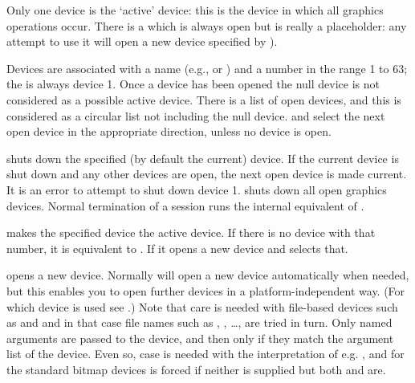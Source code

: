\begin{Details}\relax
Only one device is the `active' device: this is the device in
which all graphics operations occur.  There is a 
which is always open but is really a placeholder: any attempt to use
it will open a new device specified by
).

Devices are associated with a name (e.g.,  or
) and a number in the range 1 to 63; the
 is always device 1.  Once a device has been
opened the null device is not considered as a possible active device.
There is a list of open devices, and this is considered as a circular
list not including the null device.   and
 select the next open device in the appropriate
direction, unless no device is open.

 shuts down the specified (by default the current)
device.  If the current device is shut down and any other devices are
open, the next open device is made current.  It is an error to
attempt to shut down device 1.   shuts down all
open graphics devices.  Normal termination of a session runs the
internal equivalent of .

 makes the specified device the active device.  If there
is no device with that number, it is equivalent to .
If  it opens a new device and selects that.

 opens a new device.  Normally \R{} will open a new device
automatically when needed, but this enables you to open further
devices in a platform-independent way.  (For which device is used see
.)  Note that care is needed with
file-based devices such as  and
 and in that case file names such as
, , \dots,  are
tried in turn.  Only named arguments are passed to the device, and
then only if they match the argument list of the device.  Even so,
case is needed with the interpretation of e.g. , and for
the standard bitmap devices  is forced if
neither is supplied but both  and  are.
\end{Details}
%
